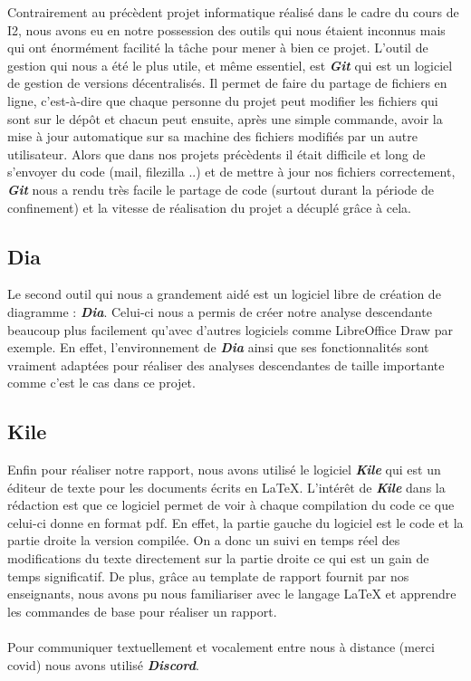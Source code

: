 \documentclass[11pt,a4paper]{article}
\begin{document}
        Contrairement au précèdent projet informatique réalisé dans le cadre du cours de I2, nous avons eu en notre possession des outils qui nous étaient inconnus mais qui ont énormément facilité la tâche pour mener à bien ce projet. L'outil de gestion qui nous a été le plus utile, et même essentiel, est \textit{\textbf{Git}} qui est un logiciel de gestion de versions décentralisés. Il permet de faire du partage de fichiers en ligne, c'est-à-dire que chaque personne du projet peut modifier les fichiers qui sont sur le dépôt et chacun peut ensuite, après une simple commande, avoir la mise à jour automatique sur sa machine des fichiers modifiés par un autre utilisateur. Alors que dans nos projets précèdents il était difficile et long de s'envoyer du code (mail, filezilla ..) et de mettre à jour nos fichiers correctement, \textit{\textbf{Git}} nous a rendu très facile le partage de code (surtout durant la période de confinement) et la vitesse de réalisation du projet a décuplé grâce à cela. 
        
        \subsection{Dia}
        
        \setlength{\parindent}{0cm}
        Le second outil qui nous a grandement aidé est un logiciel libre de création de diagramme : \textit{\textbf{Dia}}. Celui-ci nous a permis de créer notre analyse descendante beaucoup plus facilement qu'avec d'autres logiciels comme LibreOffice Draw par exemple. En effet, l'environnement de \textit{\textbf{Dia}} ainsi que ses fonctionnalités sont vraiment adaptées pour réaliser des analyses descendantes de taille importante comme c'est le cas dans ce projet.

        \subsection{Kile}
        
        Enfin pour réaliser notre rapport, nous avons utilisé le logiciel \textit{\textbf{Kile}} qui est un éditeur de texte pour les documents écrits en LaTeX. L'intérêt de \textit{\textbf{Kile}} dans la rédaction est que ce logiciel permet de voir à chaque compilation du code ce que celui-ci donne en format pdf. En effet, la partie gauche du logiciel est le code et la partie droite la version compilée. On a donc un suivi en temps réel des modifications du texte directement sur la partie droite ce qui est un gain de temps significatif. De plus, grâce au template de rapport fournit par nos enseignants, nous avons pu nous familiariser avec le langage LaTeX et apprendre les commandes de base pour réaliser un rapport.\\\\
         Pour communiquer textuellement et vocalement entre nous à distance (merci covid) nous avons utilisé \textit{\textbf{Discord}}. 
        
\end{document}
